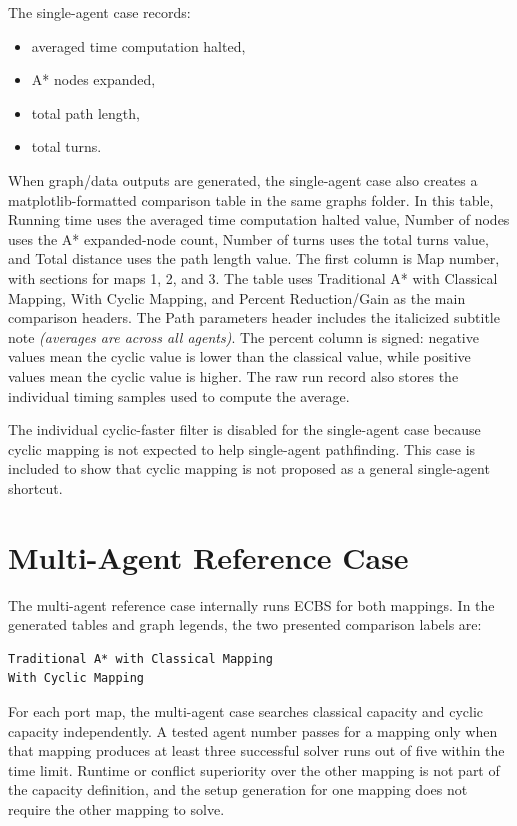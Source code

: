 \documentclass[11pt]{article}
\begin{document}
The single-agent case records:

\begin{itemize}[leftmargin=2em]
    \item averaged time computation halted,
    \item A* nodes expanded,
    \item total path length,
    \item total turns.
\end{itemize}

When graph/data outputs are generated, the single-agent case also creates a matplotlib-formatted comparison table in the same graphs folder. In this table, Running time uses the averaged time computation halted value, Number of nodes uses the A* expanded-node count, Number of turns uses the total turns value, and Total distance uses the path length value. The first column is Map number, with sections for maps 1, 2, and 3. The table uses Traditional A* with Classical Mapping, With Cyclic Mapping, and Percent Reduction/Gain as the main comparison headers. The Path parameters header includes the italicized subtitle note \textit{(averages are across all agents)}. The percent column is signed: negative values mean the cyclic value is lower than the classical value, while positive values mean the cyclic value is higher. The raw run record also stores the individual timing samples used to compute the average.

The individual cyclic-faster filter is disabled for the single-agent case because cyclic mapping is not expected to help single-agent pathfinding. This case is included to show that cyclic mapping is not proposed as a general single-agent shortcut.

\section{Multi-Agent Reference Case}

The multi-agent reference case internally runs ECBS for both mappings. In the generated tables and graph legends, the two presented comparison labels are:

\begin{lstlisting}
Traditional A* with Classical Mapping
With Cyclic Mapping
\end{lstlisting}

For each port map, the multi-agent case searches classical capacity and cyclic capacity independently. A tested agent number passes for a mapping only when that mapping produces at least three successful solver runs out of five within the time limit. Runtime or conflict superiority over the other mapping is not part of the capacity definition, and the setup generation for one mapping does not require the other mapping to solve.
\end{document}
